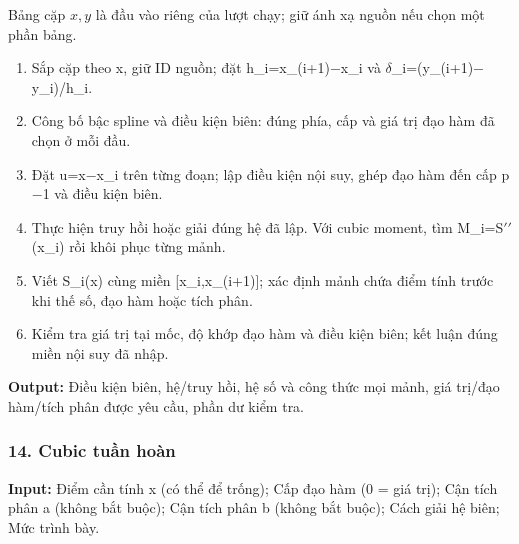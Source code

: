 Bảng cặp $x,y$ là đầu vào riêng của lượt chạy; giữ ánh xạ nguồn nếu chọn một phần bảng.

\begin{enumerate}

\item Sắp cặp theo x,\allowbreak{} giữ ID nguồn;\allowbreak{} đặt h\_i=\allowbreak{}x\_(\allowbreak{}i+\allowbreak{}1)\ensuremath{-}x\_i và \ensuremath{\delta}\_i=\allowbreak{}(\allowbreak{}y\_(\allowbreak{}i+\allowbreak{}1)\ensuremath{-}y\_i)/\allowbreak{}h\_i.

\item Công bố bậc spline và điều kiện biên: đúng phía,\allowbreak{} cấp và giá trị đạo hàm đã chọn ở mỗi đầu.

\item Đặt u=\allowbreak{}x\ensuremath{-}x\_i trên từng đoạn;\allowbreak{} lập điều kiện nội suy,\allowbreak{} ghép đạo hàm đến cấp p\ensuremath{-}1 và điều kiện biên.

\item Thực hiện truy hồi hoặc giải đúng hệ đã lập. Với cubic moment,\allowbreak{} tìm M\_i=\allowbreak{}S\ensuremath{\prime\prime}(\allowbreak{}x\_i) rồi khôi phục từng mảnh.

\item Viết S\_i(\allowbreak{}x) cùng miền [x\_i,\allowbreak{}x\_(\allowbreak{}i+\allowbreak{}1)];\allowbreak{} xác định mảnh chứa điểm tính trước khi thế số,\allowbreak{} đạo hàm hoặc tích phân.

\item Kiểm tra giá trị tại mốc,\allowbreak{} độ khớp đạo hàm và điều kiện biên;\allowbreak{} kết luận đúng miền nội suy đã nhập.

\end{enumerate}

\textbf{Output:} Điều kiện biên,\allowbreak{} hệ/\allowbreak{}truy hồi,\allowbreak{} hệ số và công thức mọi mảnh,\allowbreak{} giá trị/\allowbreak{}đạo hàm/\allowbreak{}tích phân được yêu cầu,\allowbreak{} phần dư kiểm tra.

\examplebreak\subsubsection*{14. Cubic tuần hoàn}

\textbf{Input:} Điểm cần tính x (\allowbreak{}có thể để trống);\allowbreak{} Cấp đạo hàm (\allowbreak{}0 =\allowbreak{} giá trị);\allowbreak{} Cận tích phân a (\allowbreak{}không bắt buộc);\allowbreak{} Cận tích phân b (\allowbreak{}không bắt buộc);\allowbreak{} Cách giải hệ biên;\allowbreak{} Mức trình bày.


